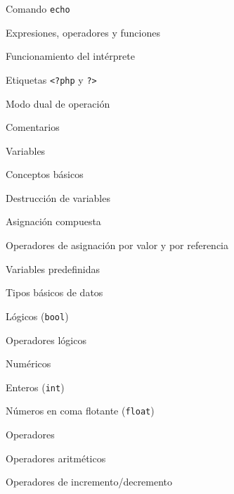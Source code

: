 \begin{longenum}
\begin{longenum}
\begin{longenum}
            \begin{longenum}
                \item Comando \texttt{echo}
            \end{longenum}
            \item Expresiones, operadores y funciones
        \end{longenum}
        \item Funcionamiento del intérprete
        \begin{longenum}
            \item Etiquetas \texttt{<?php} y \texttt{?>}
            \item Modo dual de operación
            \item Comentarios
        \end{longenum}
        \item Variables
        \begin{longenum}
            \item Conceptos básicos
            \item Destrucción de variables
            \item Asignación compuesta
            \item Operadores de asignación por valor y por referencia
            \item Variables predefinidas
        \end{longenum}
        \item Tipos básicos de datos
        \begin{longenum}
            \item Lógicos (\texttt{bool})
            \begin{longenum}
                \item Operadores lógicos
            \end{longenum}
            \item Numéricos
            \begin{longenum}
                \item Enteros (\texttt{int})
                \item Números en coma flotante (\texttt{float})
                \item Operadores
                \begin{longenum}
                    \item Operadores aritméticos
                    \item Operadores de incremento/decremento
                \end{longenum}

\end{longenum}
\end{longenum}
\end{longenum}
\end{longenum}
